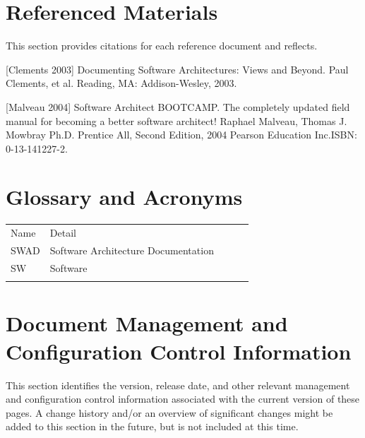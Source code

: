 \documentclass[a4paper,11pt]{book}
\begin{document}
\chapter{Referenced Materials}

This section provides citations for each reference document and reflects.
\newline

[Clements 2003]
Documenting Software Architectures: Views and Beyond. Paul Clements, et al. Reading, MA: Addison-Wesley, 2003.
\newline

[Malveau 2004]
Software Architect BOOTCAMP. The completely updated field manual for becoming a better software architect! Raphael Malveau, Thomas J. Mowbray Ph.D. Prentice All, Second Edition, 2004 Pearson Education Inc.ISBN: 0-13-141227-2.
\newline

\chapter{Glossary and Acronyms}

\begin{table}[h]
\begin{tabular}{lllll}
\cline{1-2}
\multicolumn{1}{|l|}{Name} & \multicolumn{1}{l|}{Detail}                              &  &  &  \\ \cline{1-2}
\multicolumn{1}{|l|}{SWAD}  & \multicolumn{1}{l|}{Software Architecture Documentation} &  &  &  \\ \cline{1-2}
\multicolumn{1}{|l|}{SW}   & \multicolumn{1}{l|}{Software}                            &  &  &  \\ \cline{1-2}
                           &                                                          &  &  &
\end{tabular}
\end{table}

\chapter{Document Management and Configuration Control Information}

This section identifies the version, release date, and other relevant management and configuration control information associated with the current version of these pages. A change history and/or an overview of significant changes might be added to this section in the future, but is not included at this time.
\end{document}
